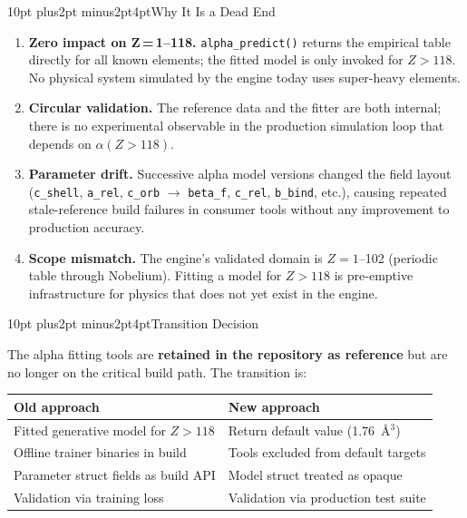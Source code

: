 \documentclass[11pt, a4paper]{article}
\makeatletter
\renewcommand{\section}{\@startsection{section}{1}{\z@}%
  {10pt plus2pt minus2pt}{4pt}{\large\bfseries}}
\makeatother
\begin{document}
\section{Why It Is a Dead End}

\begin{enumerate}
  \item \textbf{Zero impact on Z\,=\,1--118.}\;
        \texttt{alpha\_predict()} returns the empirical table directly for
        all known elements; the fitted model is only invoked for $Z > 118$.
        No physical system simulated by the engine today uses super-heavy elements.

  \item \textbf{Circular validation.}\;
        The reference data and the fitter are both internal; there is no
        experimental observable in the production simulation loop that
        depends on $\alpha(Z > 118)$.

  \item \textbf{Parameter drift.}\;
        Successive alpha model versions changed the field layout
        (\texttt{c\_shell}, \texttt{a\_rel}, \texttt{c\_orb} $\to$
        \texttt{beta\_f}, \texttt{c\_rel}, \texttt{b\_bind}, etc.),
        causing repeated stale-reference build failures in consumer tools
        without any improvement to production accuracy.

  \item \textbf{Scope mismatch.}\;
        The engine's validated domain is $Z = 1$--102 (periodic table
        through Nobelium).  Fitting a model for $Z > 118$ is pre-emptive
        infrastructure for physics that does not yet exist in the engine.
\end{enumerate}

\section{Transition Decision}

The alpha fitting tools are \textbf{retained in the repository as
reference} but are no longer on the critical build path.  The transition is:

\begin{center}
\renewcommand{\arraystretch}{1.3}
\begin{tabular}{ll}
\toprule
\textbf{Old approach} & \textbf{New approach} \\
\midrule
Fitted generative model for $Z > 118$ & Return default value (1.76~\AA$^3$) \\
Offline trainer binaries in build & Tools excluded from default targets \\
Parameter struct fields as build API & Model struct treated as opaque \\
Validation via training loss & Validation via production test suite \\
\bottomrule
\end{tabular}
\end{center}
\end{document}
